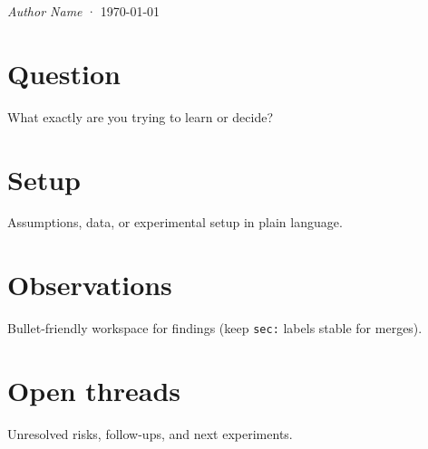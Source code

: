 \documentclass[11pt]{article}
\title{}
\author{}
\date{}
\begin{document}
\noindent\textit{Author Name} · \today

\begin{abstract}
\noindent
Short note abstract: what question you are probing and why it matters now.
\end{abstract}

\section{Question}
\label{sec:question}

What exactly are you trying to learn or decide?

\section{Setup}
\label{sec:setup}

Assumptions, data, or experimental setup in plain language.

\section{Observations}
\label{sec:observations}

Bullet-friendly workspace for findings (keep \texttt{sec:} labels stable for merges).

\section{Open threads}
\label{sec:open-threads}

Unresolved risks, follow-ups, and next experiments.

\printbibliography
\end{document}
